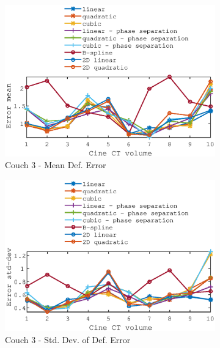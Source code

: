 \documentclass[11pt,a4paper,oneside]{report}
\begin{document}
\begin{figure}
\begin{subfigure}[b]{0.5\textwidth}
    \includegraphics[width=\textwidth, trim=0 0 0 \trimval,clip=true]{figures/task4/def_mean_error_couch3.eps}
    \caption{Couch 3 - Mean Def. Error}
  \end{subfigure}%
  \begin{subfigure}[b]{0.5\textwidth}
    \includegraphics[width=\textwidth, trim=0 0 0 \trimval,clip=true]{figures/task4/def_stddev_error_couch3.eps}
    \caption{Couch 3 - Std. Dev. of Def. Error}
  \end{subfigure}
  ~
    \hspace*{-2em}
  \begin{subfigure}[b]{0.5\textwidth}

\end{subfigure}
\end{figure}
\end{document}
